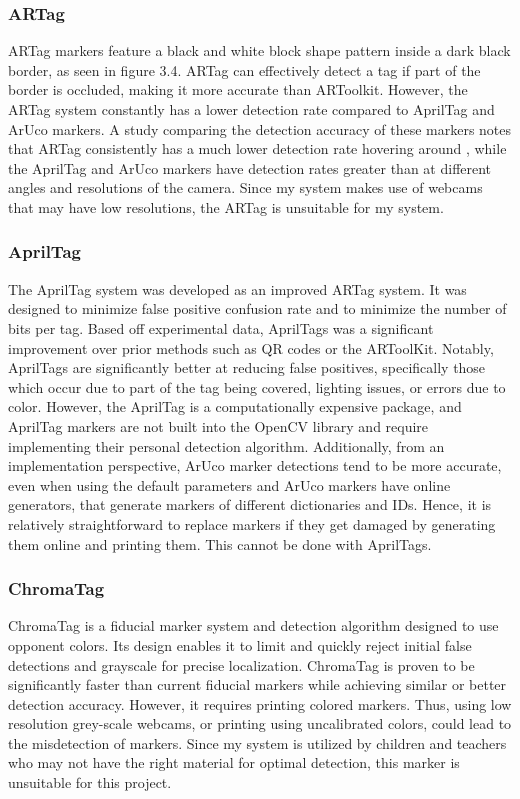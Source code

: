 \documentclass[oneside,%
                    author={Malak Hajji},
                    degree={BSc},
                    title={Designing An Accessible Computational Toolkit For Students},
                  subtitle={With Mixed Visual Abilities}]{dissertation}
\begin{document}
\subsubsection{ARTag}
ARTag markers\cite{artag} feature a black and white block shape pattern inside a dark black border, as seen in figure 3.4. ARTag can  effectively detect a tag if part of the border is occluded, making it more accurate than ARToolkit. However, the ARTag system constantly has a lower detection rate compared to AprilTag and ArUco markers. A study comparing the detection accuracy of these markers notes that ARTag consistently has a much lower detection rate hovering around , while the AprilTag and ArUco markers have detection rates greater than  at different angles and resolutions of the camera\cite{comparison}. Since my system makes use of webcams that may have low resolutions, the ARTag is unsuitable for my system.

\subsubsection{AprilTag}
The AprilTag\cite{april} system was developed as an improved ARTag system. It was designed to minimize false positive confusion rate and to minimize the number of bits per tag.
Based off experimental data, AprilTags was a significant improvement over prior methods such as QR codes or the ARToolKit. Notably, AprilTags are significantly better at reducing false positives, specifically those which occur due to part of the tag being covered, lighting issues, or errors due to color. However, the AprilTag is a computationally expensive package, and AprilTag markers are not built into the OpenCV library and require implementing their personal detection algorithm. Additionally, from an implementation perspective, ArUco marker detections tend to be more accurate, even when using the default parameters and ArUco markers have online generators, that generate markers of different dictionaries and IDs. Hence, it is relatively straightforward to replace markers if they get damaged by generating them online and printing them. This cannot be done with AprilTags.

\subsubsection{ChromaTag}
ChromaTag\cite{chroma} is a fiducial marker system and detection algorithm designed to use opponent colors. Its design enables it to limit and quickly reject initial false detections and grayscale for precise localization. ChromaTag is proven to be significantly faster than current fiducial markers while achieving similar or better detection accuracy. However, it requires printing colored markers. Thus, using low resolution grey-scale webcams, or printing using uncalibrated colors, could lead to the misdetection of markers. Since my system is utilized by children and teachers who may not have the right material for optimal detection, this marker is unsuitable for this project. 
\end{document}

